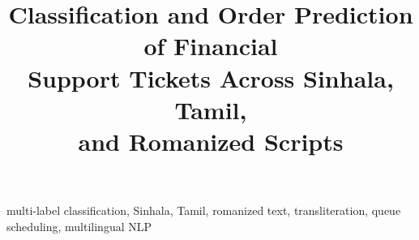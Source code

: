 \documentclass[conference,a4paper]{IEEEtran}
\newif\ifblind
\begin{document}
\title{Classification and Order Prediction of Financial\\Support Tickets Across Sinhala, Tamil,\\and Romanized Scripts}

\ifblind
  \author{}
\else
  \author{
  }
\fi

\maketitle



\begin{IEEEkeywords}
multi-label classification, Sinhala, Tamil, romanized text,
transliteration, queue scheduling, multilingual NLP
\end{IEEEkeywords}














\end{document}

